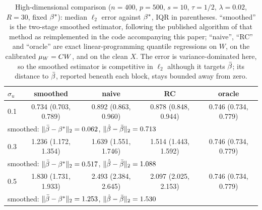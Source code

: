 \begin{table}[ht]
\centering
\footnotesize
\setlength{\tabcolsep}{3pt}
\caption{High-dimensional comparison ($n=400$, $p=500$, $s=10$, $\tau=1/2$, $\lambda=0.02$, $R=30$, fixed $\beta^*$): median $\ell_2$ error against $\beta^*$, IQR in parentheses. ``smoothed'' is the two-stage smoothed estimator, following the published algorithm of that method as reimplemented in the code accompanying this paper; ``naive'', ``RC'' and ``oracle'' are exact linear-programming quantile regressions on $W$, on the calibrated $\mu_W=C W$, and on the clean $X$. The error is variance-dominated here, so the smoothed estimator is competitive in $\ell_2$ although it targets $\bar{\beta}$; its distance to $\bar{\beta}$, reported beneath each block, stays bounded away from zero.}
\label{tab:highdim}
\begin{tabular}{lcccc}
\toprule
$\sigma_u$ & smoothed & naive & RC & oracle \\
\midrule
0.1 & 0.734 (0.703, 0.789) & 0.892 (0.863, 0.960) & 0.878 (0.848, 0.944) & 0.746 (0.734, 0.779) \\
\multicolumn{5}{l}{\quad smoothed: $\|\bar{\beta}-\beta^*\|_2=0.062$, $\|\hat\beta-\bar{\beta}\|_2=0.713$} \\
\midrule
0.3 & 1.236 (1.172, 1.354) & 1.639 (1.551, 1.746) & 1.514 (1.443, 1.592) & 0.746 (0.734, 0.779) \\
\multicolumn{5}{l}{\quad smoothed: $\|\bar{\beta}-\beta^*\|_2=0.517$, $\|\hat\beta-\bar{\beta}\|_2=1.088$} \\
\midrule
0.5 & 1.830 (1.731, 1.933) & 2.493 (2.384, 2.645) & 2.097 (2.025, 2.153) & 0.746 (0.734, 0.779) \\
\multicolumn{5}{l}{\quad smoothed: $\|\bar{\beta}-\beta^*\|_2=1.253$, $\|\hat\beta-\bar{\beta}\|_2=1.530$} \\
\bottomrule
\end{tabular}
\end{table}
